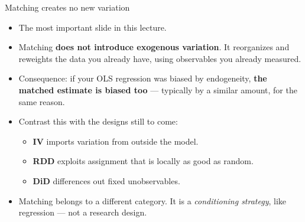\documentclass[
  11pt,
  ignorenonframetext,
  aspectratio=169,
]{beamer}
\providecommand{\tightlist}{%
  \setlength{\itemsep}{0pt}\setlength{\parskip}{0pt}}
\begin{document}
\begin{frame}{Matching creates no new variation}
\protect{}\label{matching-creates-no-new-variation}
\begin{itemize}
\tightlist
\item
  The most important slide in this lecture.
\item
  Matching \textbf{does not introduce exogenous variation}. It
  reorganizes and reweights the data you already have, using observables
  you already measured.
\item
  Consequence: if your OLS regression was biased by endogeneity,
  \textbf{the matched estimate is biased too} --- typically by a similar
  amount, for the same reason.
\item
  Contrast this with the designs still to come:

  \begin{itemize}
  \tightlist
  \item
    \textbf{IV} imports variation from outside the model.
  \item
    \textbf{RDD} exploits assignment that is locally as good as random.
  \item
    \textbf{DiD} differences out fixed unobservables.
  \end{itemize}
\item
  Matching belongs to a different category. It is a \emph{conditioning
  strategy}, like regression --- not a research design.
\end{itemize}
\end{frame}
\end{document}
